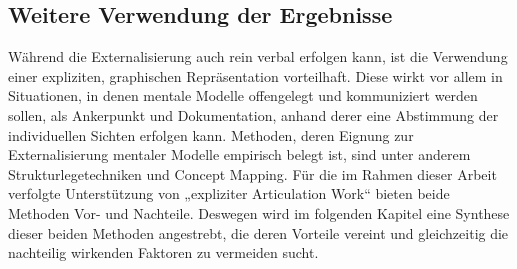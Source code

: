 \subsection{Weitere Verwendung der Ergebnisse}
Während die Externalisierung auch rein verbal erfolgen kann, ist die Verwendung einer expliziten, graphischen Repräsentation vorteilhaft. Diese wirkt vor allem in Situationen, in denen mentale Modelle offengelegt und kommuniziert werden sollen, als Ankerpunkt und Dokumentation, anhand derer eine Abstimmung der individuellen Sichten erfolgen kann. Methoden, deren Eignung zur Externalisierung mentaler Modelle empirisch belegt ist, sind unter anderem Strukturlegetechniken und Concept Mapping. Für die im Rahmen dieser Arbeit verfolgte Unterstützung von „expliziter Articulation Work“ bieten beide Methoden Vor- und Nachteile. Deswegen wird im folgenden Kapitel eine Synthese dieser beiden Methoden angestrebt, die deren Vorteile vereint und gleichzeitig die nachteilig wirkenden Faktoren zu vermeiden sucht.



